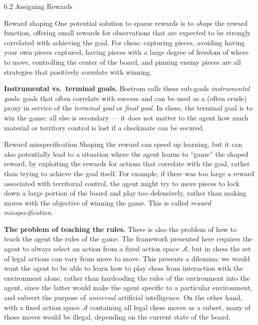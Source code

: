 \documentclass[aspectratio=169,10pt]{beamer}
\newcommand{\A}{\mathcal{A}}
\begin{document}
\begin{frame}[allowframebreaks]{6.2 Assigning Rewards}
\begin{block}{Reward shaping}
One potential solution to sparse rewards is to \emph{shape} the reward
function, offering small rewards for observations that are expected to be
strongly correlated with achieving the goal. For chess: capturing pieces,
avoiding having your own pieces captured, having pieces with a large
degree of freedom of where to move, controlling the center of the board,
and pinning enemy pieces are all strategies that positively correlate with
winning.
\end{block}

\textbf{Instrumental vs.\ terminal goals.} Bostrom calls these sub-goals
\emph{instrumental goals}: goals that often correlate with success and can
be used as a (often crude) proxy in service of the \emph{terminal goal} or
\emph{final goal}. In chess, the terminal goal is to win the game; all else
is secondary --- it does not matter to the agent how much material or
territory control is lost if a checkmate can be secured.

\framebreak

\begin{block}{Reward misspecification}
Shaping the reward can speed up learning, but it can also potentially lead
to a situation where the agent learns to ``game'' the shaped reward, by
exploiting the rewards for actions that correlate with the goal, rather
than trying to achieve the goal itself. For example, if there was too large
a reward associated with territorial control, the agent might try to move
pieces to lock down a large portion of the board and play too defensively,
rather than making moves with the objective of winning the game. This is
called \emph{reward misspecification}.
\end{block}

\textbf{The problem of teaching the rules.} There is also the problem of
how to teach the agent the rules of the game. The framework presented here
requires the agent to always select an action from a fixed action space
$\A$, but in chess the set of legal actions can vary from move to move.
This presents a dilemma: we would want the agent to be able to learn how to
play chess from interaction with the environment alone, rather than
hardcoding the rules of the environment into the agent, since the latter
would make the agent specific to a particular environment, and subvert the
purpose of \emph{universal} artificial intelligence. On the other hand,
with a fixed action space $\A$ containing all legal chess moves as a
subset, many of those moves would be illegal, depending on the current
state of the board.


\end{frame}
\end{document}
